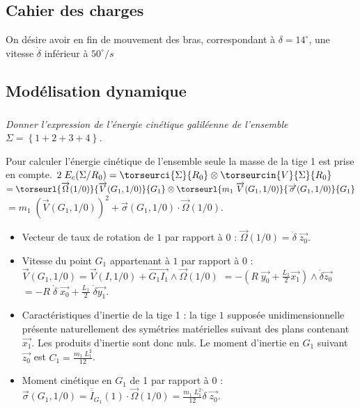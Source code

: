 \begin{multicols}{2}
\subsection*{Cahier des charges}
On désire avoir en fin de mouvement des bras, correspondant à $\delta=14^{\circ}$, une vitesse $\dot{\delta}$ inférieur à $50^{\circ}/s$

\subsection*{Modélisation dynamique}

\subparagraph{}
\textit{Donner l'expression de l'énergie cinétique galiléenne de l'ensemble $\Sigma=\left\{1+2+3+4\right\}$.}
\ifprof
\begin{corrige}
Pour calculer l'énergie cinétique de l'ensemble seule la masse de la tige 1 est prise en compte.
$
2\;E_c(\Sigma/R_0)=\torseurci{\Sigma}{R_0}\otimes \torseurcin{V}{\Sigma}{R_0}$
$=\torseurl{\overrightarrow{\Omega}(1/0)}{\overrightarrow{V}(G_1,1/0)}{G_1}\otimes \torseurl{m_1\;\overrightarrow{V}(G_1,1/0)}{\overrightarrow{\sigma}(G_1,1/0)}{G_1}$
$=m_1\;\left(\overrightarrow{V}(G_1,1/0)\right)^2+\overrightarrow{\sigma}(G_1,1/0)\cdot \overrightarrow{\Omega}(1/0). 
$

\begin{itemize}
\item Vecteur de taux de rotation de $1$ par rapport à $0$ : $
\overrightarrow{\Omega}(1/0)=\dot{\delta}\;\overrightarrow{z_0}.
$

\item Vitesse du point $G_1$ appartenant à $1$ par rapport à $0$ : $
\overrightarrow{V}(G_1,1/0)=\overrightarrow{V}(I,1/0)+\overrightarrow{G_1I_1}\wedge\overrightarrow{\Omega}(1/0)$
$=-\left(R\;\overrightarrow{y_0}+\frac{L_1}{2}\overrightarrow{x_1}\right)\wedge\dot{\delta}\overrightarrow{z_0}$
$=-R\;\dot{\delta}\;\overrightarrow{x_0}+\frac{L_1}{2}\;\dot{\delta}\overrightarrow{y_1}$.


\item Caractéristiques d'inertie de la tige 1 : la tige $1$ supposée unidimensionnelle présente naturellement des symétries matérielles suivant des plans contenant $\overrightarrow{x_1}$. Les produits d'inertie sont donc nuls. Le moment d'inertie en $G_1$ suivant $\overrightarrow{z_0}$ est $C_1=\frac{m_1\;L_1^2}{12}$.

\item Moment cinétique en $G_1$ de 1 par rapport à 0 : $
\overrightarrow{\sigma}(G_1,1/0)=\overline{\overline{I}}_{G_1}(1)\cdot \overrightarrow{\Omega}(1/0)=\frac{m_1\;L_1^2}{12}\dot{\delta}\;\overrightarrow{z_0}
$.


\end{itemize}
\end{corrige}
\end{multicols}
